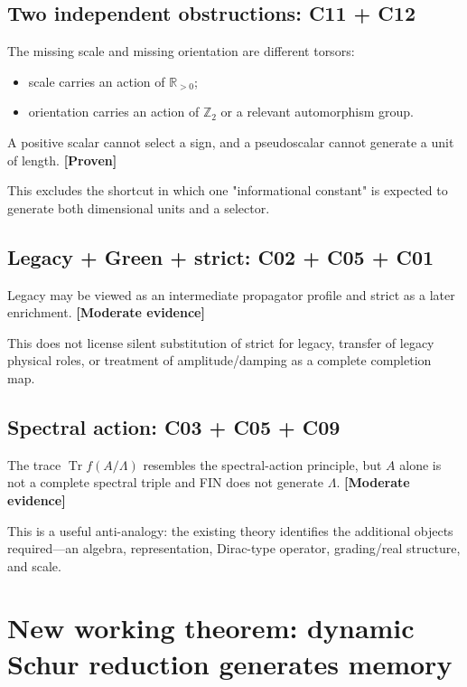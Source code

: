 \documentclass[11pt,a4paper,openany]{report}
\newcommand{\statusProven}{\textcolor{fingreen}{[Proven]}}
\newcommand{\statusModerate}{\textcolor{finviolet}{[Moderate evidence]}}
\begin{document}
\section{Two independent obstructions: C11 + C12}

The missing scale and missing orientation are different torsors:

\begin{itemize}
\item 
scale carries an action of \(\mathbb R_{>0}\);

\item 
orientation carries an action of \(\mathbb Z_2\) or a relevant automorphism group.

\end{itemize}

A positive scalar cannot select a sign, and a pseudoscalar cannot generate a unit of length. \textbf{\statusProven{}}

This excludes the shortcut in which one "informational constant" is expected to generate both dimensional units and a selector.

\section{Legacy + Green + strict: C02 + C05 + C01}

Legacy may be viewed as an intermediate propagator profile and strict as a later enrichment. \textbf{\statusModerate{}}

This does not license silent substitution of strict for legacy, transfer of legacy physical roles, or treatment of amplitude/\allowbreak{}damping as a complete completion map.

\section{Spectral action: C03 + C05 + C09}

The trace \(\operatorname{Tr}f(A/\Lambda)\) resembles the spectral-action principle, but \(A\) alone is not a complete spectral triple and FIN does not generate \(\Lambda\). \textbf{\statusModerate{}}

This is a useful anti-analogy: the existing theory identifies the additional objects required---an algebra, representation, Dirac-type operator, grading/\allowbreak{}real structure, and scale.

\chapter{New working theorem: dynamic Schur reduction generates memory}
\end{document}
